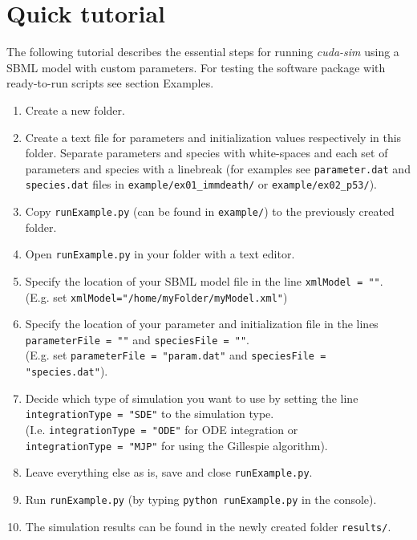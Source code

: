 \documentclass [11pt, a4paper, openany, twoside=off] {article}
\begin{document}
        

\newpage
\section{Quick tutorial}
The following tutorial describes the essential steps for running \emph{cuda-sim} using a SBML model with custom parameters. For testing the software package with ready-to-run scripts see section Examples.\\ 

\begin{enumerate}
    \item Create a new folder.
    \item Create a text file for parameters and initialization values respectively in this folder. Separate parameters and species with white-spaces and each set of parameters and species with a linebreak (for examples see \verb$parameter.dat$ and \verb$species.dat$ files in \verb$example/ex01_immdeath/$ or \verb$example/ex02_p53/$). 
    \item Copy \verb$runExample.py$ (can be found in \verb$example/$) to the previously created folder.
    \item Open \verb$runExample.py$ in your folder with a text editor.
    \item Specify the location of your SBML model file in the line \verb$xmlModel = ""$.\\ (E.g. set \verb$xmlModel="/home/myFolder/myModel.xml"$)
    \item Specify the location of your parameter and initialization file in the lines\\ \verb$parameterFile = ""$ and \verb$speciesFile = ""$.\\ (E.g. set \verb$parameterFile = "param.dat"$ and \verb$speciesFile = "species.dat"$). 
    \item Decide which type of simulation you want to use by setting the line \\\verb$integrationType = "SDE"$ to the simulation type. \\(I.e. \verb$integrationType = "ODE"$ for ODE integration or\\ \verb$integrationType = "MJP"$ for using the Gillespie algorithm).
    \item Leave everything else as is, save and close \verb$runExample.py$.
    \item Run \verb$runExample.py$ (by typing \verb$python runExample.py$ in the console).
    \item The simulation results can be found in the newly created folder \verb$results/$.
\end{enumerate}
\end{document}
